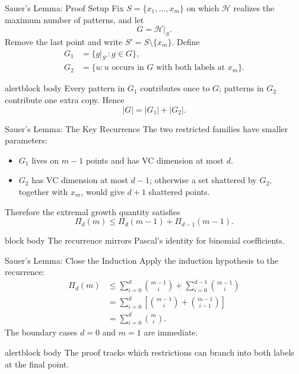 \documentclass[aspectratio=169,10pt]{beamer}
\newcommand{\Hc}{\mathcal{H}}
\newcommand{\abs}[1]{\left\lvert #1\right\rvert}
\newcommand{\KeyBox}[1]{%
  \begin{beamercolorbox}[rounded=true,sep=0.22cm,wd=\linewidth]{block body}
    #1
  \end{beamercolorbox}%
}
\newcommand{\OrangeBox}[1]{%
  \begin{beamercolorbox}[rounded=true,sep=0.22cm,wd=\linewidth]{alertblock body}
    #1
  \end{beamercolorbox}%
}
\begin{document}
\begin{frame}[t]{Sauer's Lemma: Proof Setup}
  \vspace{0.01cm}
  Fix $S=\{x_1,\ldots,x_m\}$ on which $\Hc$ realizes the maximum number of patterns, and let
  \[
    G=\Hc\vert_S.
  \]
  Remove the last point and write $S'=S\setminus\{x_m\}$. Define
  \begin{align*}
    G_1&=\{g\vert_{S'}:g\in G\},\\
    G_2&=\{u:\text{$u$ occurs in $G$ with both labels at $x_m$}\}.
  \end{align*}
  \vspace{0.02cm}
  \begin{beamercolorbox}[rounded=true,sep=0.16cm,wd=\linewidth]{alertblock body}
    Every pattern in $G_1$ contributes once to $G$; patterns in $G_2$ contribute one extra copy. Hence
    \[
      \abs{G}=\abs{G_1}+\abs{G_2}.
    \]
  \end{beamercolorbox}
\end{frame}

\begin{frame}[t]{Sauer's Lemma: The Key Recurrence}
  \vspace{0.03cm}
  The two restricted families have smaller parameters:
  \begin{itemize}
    \setlength{\itemsep}{0.15cm}
    \item $G_1$ lives on $m-1$ points and has VC dimension at most $d$.
    \item $G_2$ has VC dimension at most $d-1$; otherwise a set shattered by $G_2$, together with $x_m$, would give $d+1$ shattered points.
  \end{itemize}
  Therefore the extremal growth quantity satisfies
  \[
    \Pi_d(m)
    \le \Pi_d(m-1)+\Pi_{d-1}(m-1).
  \]
  \vspace{0.08cm}
  \KeyBox{The recurrence mirrors Pascal's identity for binomial coefficients.}
\end{frame}

\begin{frame}[t]{Sauer's Lemma: Close the Induction}
  \vspace{-0.02cm}
  {\small
  Apply the induction hypothesis to the recurrence:
  \begin{align*}
    \Pi_d(m)
    &\le \sum_{i=0}^{d}\binom{m-1}{i}
      +\sum_{i=0}^{d-1}\binom{m-1}{i}\\
    &=\sum_{i=0}^{d}
      \left[\binom{m-1}{i}+\binom{m-1}{i-1}\right]\\
    &=\sum_{i=0}^{d}\binom{m}{i}.
  \end{align*}
  The boundary cases $d=0$ and $m=1$ are immediate.}
  \vspace{0.02cm}
  \OrangeBox{\small The proof tracks which restrictions can branch into both labels at the final point.}
\end{frame}
\end{document}

